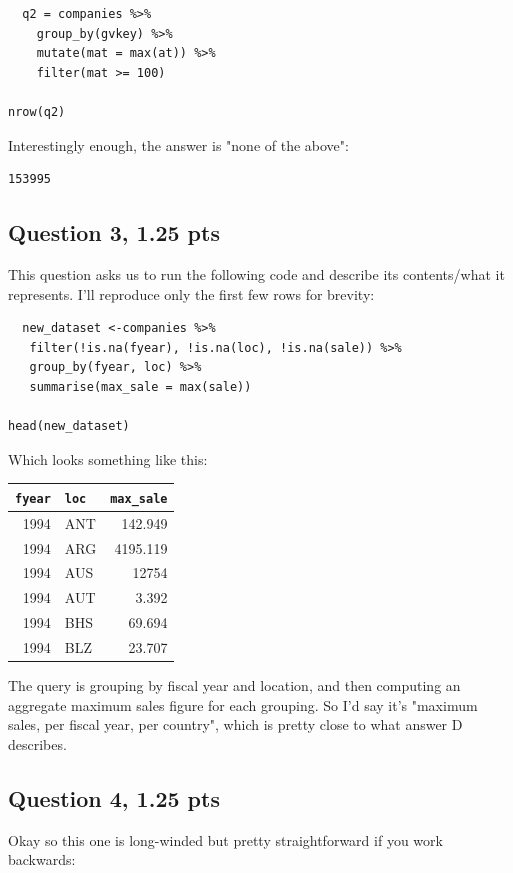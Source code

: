 \documentclass[11pt]{article}
\begin{document}
\begin{verbatim}
  q2 = companies %>%
    group_by(gvkey) %>%
    mutate(mat = max(at)) %>%
    filter(mat >= 100)

nrow(q2)
\end{verbatim}

Interestingly enough, the answer is "none of the above":

\begin{verbatim}
153995
\end{verbatim}

\subsection*{Question 3, 1.25 pts}
\label{sec:orgcb69982}
This question asks us to run the following code and describe its contents/what it represents.  I'll reproduce only the first few rows for brevity:

\begin{verbatim}
  new_dataset <-companies %>%
   filter(!is.na(fyear), !is.na(loc), !is.na(sale)) %>%
   group_by(fyear, loc) %>%
   summarise(max_sale = max(sale))

head(new_dataset)
\end{verbatim}

Which looks something like this:

\begin{center}
\begin{tabular}{rlr}
\texttt{fyear} & \texttt{loc} & \texttt{max\_sale}\\[0pt]
\hline
1994 & ANT & 142.949\\[0pt]
1994 & ARG & 4195.119\\[0pt]
1994 & AUS & 12754\\[0pt]
1994 & AUT & 3.392\\[0pt]
1994 & BHS & 69.694\\[0pt]
1994 & BLZ & 23.707\\[0pt]
\end{tabular}
\end{center}

The query is grouping by fiscal year and location, and then computing an aggregate maximum sales figure for each grouping.  So I'd say it's "maximum sales, per fiscal year, per country", which is pretty close to what answer D describes.

\subsection*{Question 4, 1.25 pts}
\label{sec:org89c107c}
Okay so this one is long-winded but pretty straightforward if you work backwards:
\end{document}
